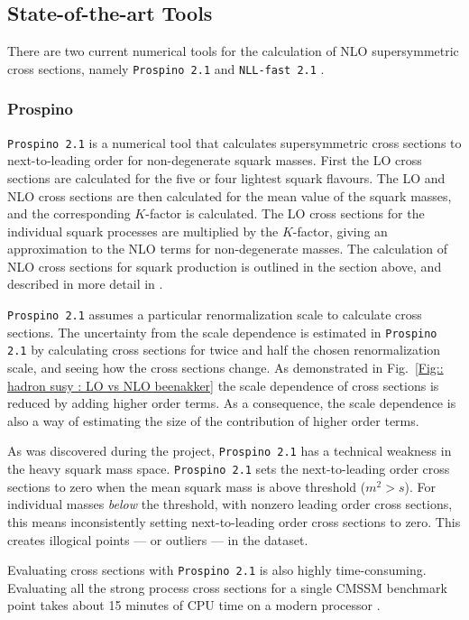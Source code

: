 \documentclass[twoside,english]{uiofysmaster}
\begin{document}
{{\subsection{State-of-the-art Tools}

There are two current numerical tools for the calculation of NLO supersymmetric cross sections, namely \verb|Prospino 2.1| \cite{beenakker1996prospino} and \verb|NLL-fast 2.1| \cite{beenakker2016nlo+}.

\subsubsection{Prospino}\label{Sec:: susy hadron : Prospino}
\verb|Prospino 2.1| \cite{beenakker1996prospino} is a numerical tool that calculates supersymmetric cross sections to next-to-leading order for non-degenerate squark masses. First the LO cross sections are calculated for the five or four lightest squark flavours. The LO and NLO cross sections are then calculated for the mean value of the squark masses, and the corresponding $K$-factor is calculated. The LO cross sections for the individual squark processes are multiplied by the $K$-factor, giving an approximation to the NLO terms for non-degenerate masses. The calculation of NLO cross sections for squark production is outlined in the section above, and described in more detail in \cite{beenakker1996prospino}. 

\verb|Prospino 2.1| assumes a particular renormalization scale to calculate cross sections. The uncertainty from the scale dependence is estimated in \verb|Prospino 2.1| by calculating cross sections for twice and half the chosen renormalization scale, and seeing how the cross sections change. As demonstrated in Fig.~\ref{Fig:: hadron susy : LO vs NLO beenakker} the scale dependence of cross sections is reduced by adding higher order terms. As a consequence, the scale dependence is also a way of estimating the size of the contribution of higher order terms. 


As was discovered during the project, \verb|Prospino 2.1| has a technical weakness in the heavy squark mass space. \verb|Prospino 2.1| sets the next-to-leading order cross sections to zero when the mean squark mass is above threshold ($m^2 > s$). For individual masses \textit{below} the threshold, with nonzero leading order cross sections, this means inconsistently setting next-to-leading order cross sections to zero. This creates illogical points --- or outliers --- in the dataset.

Evaluating cross sections with \verb|Prospino 2.1| is also highly time-consuming. Evaluating all the strong process cross sections for a single CMSSM benchmark point takes about 15 minutes of CPU time on a modern processor \cite{balazs2017colliderbit}. 


}}
\end{document}
